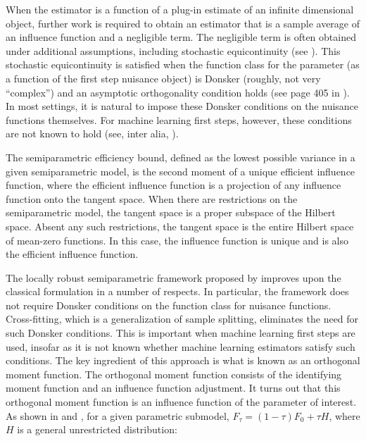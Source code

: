 When the estimator is a function of a plug-in estimate of an infinite dimensional object, further work is required to obtain an estimator that is a sample average of an influence function and a negligible term. The negligible term is often obtained under additional assumptions, including stochastic equicontinuity (see \citet{tsiatis2006semiparametric}). This stochastic equicontinuity is satisfied when the function class for the parameter (as a function of the first step nuisance object) is Donsker (roughly, not very \enquote{complex}) and an asymptotic orthogonality condition holds (see page 405 in \citet{kosorok2008introduction}). In most settings, it is natural to impose these Donsker conditions on the nuisance functions themselves. For machine learning first steps, however, these conditions are not known to hold (see, inter alia, \citet{chernozhukov2018double}).

 The semiparametric efficiency bound, defined as the lowest possible variance in a given semiparametric model, is the second moment of a unique efficient influence function, where the efficient influence function is a projection of any influence function onto the tangent space. When there are restrictions on the semiparametric model, the tangent space is a proper subspace of the Hilbert space. Absent any such restrictions, the tangent space is the entire Hilbert space of mean-zero functions. In this case, the influence function is unique and is also the efficient influence function. 

The locally robust semiparametric framework proposed by \citet{chernozhukov2022locally} improves upon the classical formulation in a number of respects. In particular, the framework does not require Donsker conditions on the function class for nuisance functions. Cross-fitting, which is a generalization of sample splitting, eliminates the need for such Donsker conditions. This is important when machine learning first steps are used, insofar as it is not known whether machine learning estimators satisfy such conditions.  
The key ingredient of this approach is what is known as an orthogonal moment function. The orthogonal moment function consists of the identifying moment function and an influence function adjustment. It turns out that this orthogonal moment function is an influence function of the parameter of interest. As shown in \citet{ichimura2022influence} and \citet{chernozhukov2022locally}, for a given parametric submodel, $F_\tau=(1-\tau) F_0+\tau H$, where $H$ is a general unrestricted distribution:

